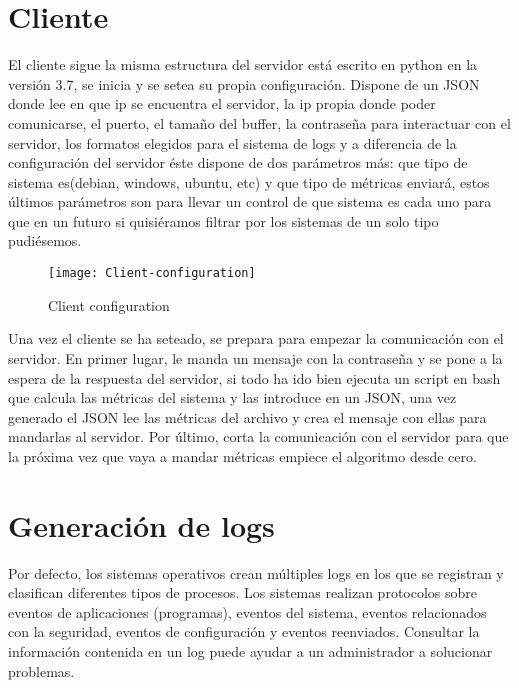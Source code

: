 \documentclass[ spanish, a4paper, 12pt, oneside]{report}
\begin{document}
\section{Cliente}
El cliente sigue la misma estructura del servidor está escrito en python en la versión 3.7, se inicia y se setea su propia configuración. Dispone de un JSON donde lee en que ip se encuentra el servidor, la ip propia donde poder comunicarse, el puerto, 
el tamaño del buffer, la contraseña para interactuar con el servidor, los formatos elegidos para el sistema de logs y a diferencia de la configuración del servidor éste dispone de dos parámetros más: que tipo 
de sistema es(debian, windows, ubuntu, etc) y que tipo de métricas enviará, estos últimos parámetros son para llevar un control de que sistema es cada uno para que en un futuro si quisiéramos filtrar por los sistemas 
de un solo tipo pudiésemos. \\

\begin{figure}[!h]
   \centering
   \texttt{[image: Client-configuration]}\\
      \caption{\label{fig: Client configuration} Client configuration}
\end{figure}

Una vez el cliente se ha seteado, se prepara para empezar la comunicación con el servidor. En primer lugar, le manda un mensaje con la contraseña y se pone a la espera de la respuesta del servidor, si todo ha ido bien 
ejecuta un script en bash que calcula las métricas del sistema y las introduce en un JSON, una vez generado el JSON lee las métricas del archivo y crea el mensaje con ellas para mandarlas al servidor. Por último, corta la comunicación 
con el servidor para que la próxima vez que vaya a mandar métricas empiece el algoritmo desde cero. \\

\section{Generación de logs}
Por defecto, los sistemas operativos crean múltiples logs en los que se registran y clasifican diferentes tipos de procesos. Los sistemas realizan protocolos sobre eventos de aplicaciones (programas), eventos del sistema, eventos relacionados 
con la seguridad, eventos de configuración y eventos reenviados. Consultar la información contenida en un log puede ayudar a un administrador a solucionar problemas.\\
\end{document}
